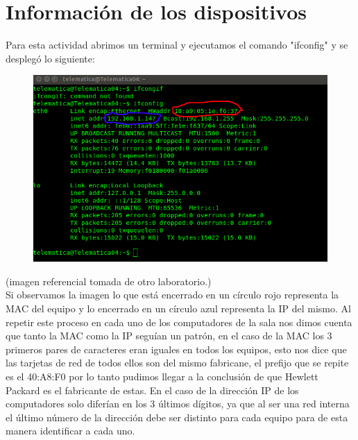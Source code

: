 \documentclass{udpreport}
\begin{document}
	\section{Información de los dispositivos}
		Para esta actividad abrimos un terminal y ejecutamos el comando "ifconfig" y se desplegó lo siguiente:\\
		\begin{figure}[h]
    		\centering
    	\includegraphics[width=\textwidth]{Terminal.png}
		\end{figure}
		(imagen referencial tomada de otro laboratorio.)\\
		Si observamos la imagen lo que está encerrado en un círculo rojo representa la MAC del equipo y lo encerrado en un         		círculo azul representa la IP del mismo. Al repetir este proceso en cada uno de los computadores de la sala nos     	        dimos cuenta que tanto la MAC como la IP seguían un patrón, en el caso de la MAC los 3 primeros pares de caracteres      		        eran iguales en todos los equipos, esto nos dice que las tarjetas de red de todos ellos son del mismo fabricane,      		el prefijo que se repite es el 40:A8:F0 por lo tanto pudimos llegar a la conclusión de que Hewlett Packard es el                       fabricante de estas. En el caso de la dirección IP de los computadores solo diferían en los 3 últimos dígitos, ya                     que al ser una red interna el último número de la dirección debe ser distinto para cada equipo para de esta manera                    identificar a cada uno.
\end{document}
